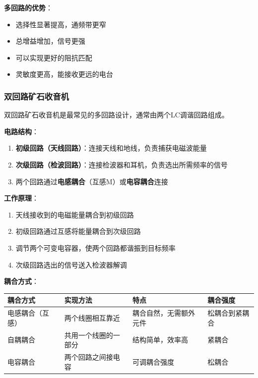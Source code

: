 \textbf{多回路的优势}：
\begin{itemize}
    \item 选择性显著提高，通频带更窄
    \item 总增益增加，信号更强
    \item 可以实现更好的阻抗匹配
    \item 灵敏度更高，能接收更远的电台
\end{itemize}

\subsubsection{双回路矿石收音机}
\label{sec:double_loop_crystal_radio}

双回路矿石收音机是最常见的多回路设计，通常由两个LC调谐回路组成。

\textbf{电路结构}：
\begin{enumerate}
    \item \textbf{初级回路（天线回路）}：连接天线和地线，负责捕获电磁波能量
    \item \textbf{次级回路（检波回路）}：连接检波器和耳机，负责选出所需频率的信号
    \item 两个回路通过\textbf{电感耦合}（互感M）或\textbf{电容耦合}连接
\end{enumerate}

\textbf{工作原理}：
\begin{enumerate}
    \item 天线接收到的电磁能量耦合到初级回路
    \item 初级回路通过互感将能量耦合到次级回路
    \item 调节两个可变电容器，使两个回路都谐振到目标频率
    \item 次级回路选出的信号送入检波器解调
\end{enumerate}

\textbf{耦合方式}：

\begin{center}
\begin{tabular}{|p{3cm}|p{4cm}|p{4cm}|p{3cm}|}
\hline
\textbf{耦合方式} & \textbf{实现方法} & \textbf{特点} & \textbf{耦合强度} \\
\hline
电感耦合（互感） & 两个线圈相互靠近 & 耦合自然，无需额外元件 & 松耦合到紧耦合 \\
自耦耦合 & 共用一个线圈的一部分 & 结构简单，效率高 & 紧耦合 \\
电容耦合 & 两个回路之间接电容 & 可调耦合强度 & 松耦合 \\
\hline
\end{tabular}
\end{center}

